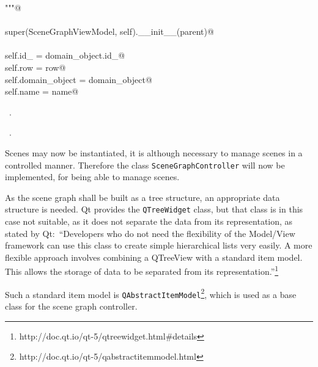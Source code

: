 \documentclass[
    a4paper,      %
    10pt,         %
    openright,    %
    notitlepage,  %
    parskip=half, %
]{scrreprt}       %
\theoremstyle{definition}                    %
\begin{document}
\begin{flushleft}
\begin{minipage}{\linewidth}
\begin{list}{}{}
\mbox{}\lstinline@    """@\\
\mbox{}\lstinline@@\\
\mbox{}\lstinline@    super(SceneGraphViewModel, self).__init__(parent)@\\
\mbox{}\lstinline@@\\
\mbox{}\lstinline@    self.id_ = domain_object.id_@\\
\mbox{}\lstinline@    self.row  = row@\\
\mbox{}\lstinline@    self.domain_object = domain_object@\\
\mbox{}\lstinline@    self.name = name@\\
\mbox{}\lstinline@@{\NWsep}
\end{list}
\vspace{-1.5ex}
\footnotesize
\begin{list}{}{\setlength{\itemsep}{-\parsep}\setlength{\itemindent}{-\leftmargin}}
\item \NWtxtMacroDefBy\ .
\item \NWtxtMacroRefIn\ .

\item{}
\end{list}
\end{minipage}\vspace{4ex}
\end{flushleft}
Scenes may now be instantiated, it is although necessary to manage scenes in a
controlled manner. Therefore the class \verb+SceneGraphController+ will now be
implemented, for being able to manage scenes.

As the scene graph shall be built as a tree structure, an appropriate data
structure is needed. Qt provides the \verb+QTreeWidget+ class, but that
class is in this case not suitable, as it does not separate the data from its
representation, as stated by Qt:~\enquote{Developers who do not need the flexibility of
the Model/View framework can use this class to create simple hierarchical lists
very easily. A more flexible approach involves combining a QTreeView with a
standard item model. This allows the storage of data to be separated from its
representation.}\footnote{http://doc.qt.io/qt-5/qtreewidget.html\#details}

Such a standard item model is
\verb+QAbstractItemModel+\footnote{\label{footnote:qabstractitemmodel}
http://doc.qt.io/qt-5/qabstractitemmodel.html}, which is used as a base class
for the scene graph controller.
\end{document}
